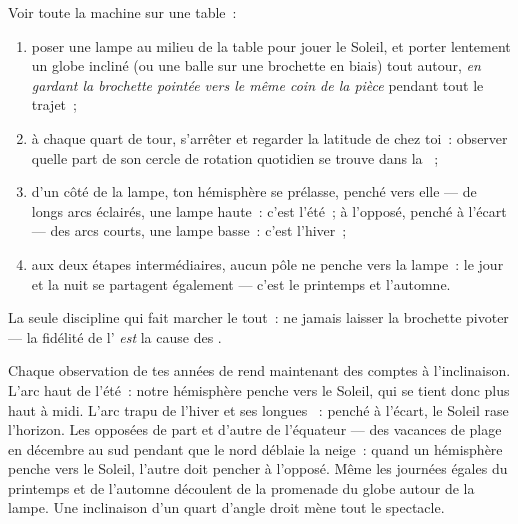 \begin{method}\label{met:g6:sun-earth-moon:globe}
Voir toute la machine sur une table~:
\begin{enumerate}
  \item poser une lampe au milieu de la table pour jouer le Soleil,
        et porter lentement un globe incliné (ou une balle sur une
        brochette en biais) tout autour, \emph{en gardant la
        brochette pointée vers le même coin de la pièce} pendant
        tout le trajet~;
  \item à chaque quart de tour, s'arrêter et regarder la latitude
        de chez toi~: observer quelle part de son cercle de
        rotation quotidien se trouve dans la ~;
  \item d'un côté de la lampe, ton hémisphère se prélasse, penché
        vers elle --- de longs arcs éclairés, une lampe haute~:
        c'est l'été~; à l'opposé, penché à l'écart --- des arcs
        courts, une lampe basse~: c'est l'hiver~;
  \item aux deux étapes intermédiaires, aucun pôle ne penche vers
        la lampe~: le jour et la nuit se partagent également ---
        c'est le printemps et l'automne.
\end{enumerate}
La seule discipline qui fait marcher le tout~: ne jamais laisser la
brochette pivoter --- la fidélité de l' \emph{est} la cause des
.
\end{method}

\begin{example}\label{ex:g6:sun-earth-moon:clues}
Chaque observation de tes années de  rend maintenant
des comptes à l'inclinaison. L'arc haut de l'été~: notre hémisphère
penche vers le Soleil, qui se tient donc plus haut à midi. L'arc
trapu de l'hiver et ses longues ~: penché à l'écart, le Soleil
rase l'horizon. Les  opposées de part et d'autre de
l'équateur --- des vacances de plage en décembre au sud pendant que
le nord déblaie la neige~: quand un hémisphère penche vers le Soleil,
l'autre doit pencher à l'opposé. Même les journées égales du
printemps et de l'automne découlent de la promenade du globe autour
de la lampe. Une inclinaison d'un quart d'angle droit mène tout le
spectacle.
\end{example}

